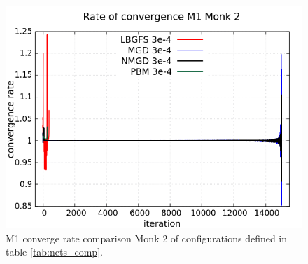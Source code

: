 \begin{figure}[H]
	\centering
	\includegraphics[width=0.6\linewidth]{data/Comparison/Monk2/Monk2_M1_CR_standard.png}
	\caption{M1 converge rate comparison Monk 2 of configurations defined in table \ref{tab:nets_comp}.}
	\label{fig:CR-M1-Monk2-Standard}
\end{figure}

